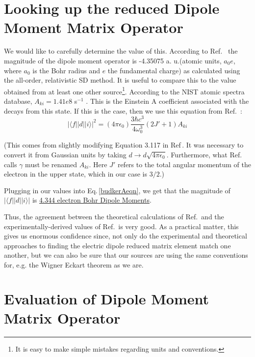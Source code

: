 \section{Looking up the reduced Dipole Moment Matrix Operator} \label{lookItUp}
We would like to carefully determine the value of this. According to Ref.\ \cite{safronova2photon} the magnitude of the dipole moment operator is -4.35075 a. u.(atomic units, $a_0 e$, where $a_0$ is the Bohr radius and $e$ the fundamental charge) as calculated using the all-order, relativistic SD method. It is useful to compare this to the value obtained from at least one other source\footnote{It is easy to make simple mistakes regarding units and conventions.}. According to the NIST atomic spectra database, $A_{ki}=1.41e8$ s$^{-1}$ \cite{NISTasd}. This is the Einstein A coefficient associated with the decays from this state. If this is the case, then we use this equation from Ref.\ \cite{demilleBudkerKimball}:  
\begin{equation}
|\langle f ||d|| i \rangle|^2 = (4 \pi \epsilon_0) \frac{3 \hbar c^3}{4 \omega_0^3} (2 J'+1) A_{ki}\label{budkerAeqn}
\end{equation}

(This comes from slightly modifying Equation 3.117 in Ref\,\cite{demilleBudkerKimball}. It was necessary to convert it from Gaussian units by taking $d\rightarrow d \sqrt{4 \pi \epsilon_0}$. Furthermore, what Ref.\ \cite{demilleBudkerKimball} calls $\gamma$ must be renamed $A_{ki}$. Here $J'$ refers to the total angular momentum of the electron in the upper state, which in our case is $3/2$.) 

Plugging in our values into Eq.\,\ref{budkerAeqn}, we get that the magnitude of $|\langle f ||d|| i \rangle|$ is \href{http://www.wolframalpha.com/input/?i=sqrt%283*hbar*c%5E3%2F%284*%282*pi*c%2F407.771+nm%29%5E3%29*4*pi*epsilon_0*4*1.41e8*1%2Fs%29}{4.344 electron Bohr Dipole Moments}.

Thus, the agreement between the theoretical calculations of Ref.\,\cite{safronova2photon} and the experimentally-derived values of Ref.\,\cite{NISTasd} is very good. As a practical matter, this gives us enormous confidence since, not only do the experimental and theoretical approaches to finding the electric dipole reduced matrix element match one another, but we can also be sure that our sources are using the same conventions for, e.g. the Wigner Eckart theorem as we are.

\section{Evaluation of Dipole Moment Matrix Operator}

